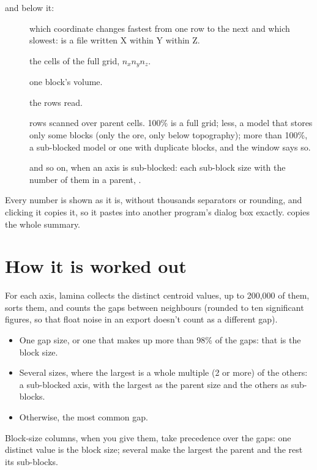 and below it:

\begin{description}
\item[] which coordinate changes fastest from one row to the next and which slowest:
 is a file written X within Y within Z.
\item[] the cells of the full grid, $n_x n_y n_z$.
\item[] one block's volume.
\item[] the rows read.
\item[] rows scanned over parent cells. 100\% is a full grid; less, a model that stores only
some blocks (only the ore, only below topography); more than 100\%, a sub-blocked model or one with
duplicate blocks, and the window says so.
\item[] and so on, when an axis is sub-blocked: each sub-block size with the number of
them in a parent, .
\end{description}

Every number is shown as it is, without thousands separators or rounding, and clicking it copies it, so
it pastes into another program's dialog box exactly.  copies the whole summary.

\section{How it is worked out}\label{sec:gridsum-method}

For each axis, lamina collects the distinct centroid values, up to 200{,}000 of them, sorts them, and
counts the gaps between neighbours (rounded to ten significant figures, so that float noise in an
export doesn't count as a different gap).

\begin{itemize}
\item One gap size, or one that makes up more than 98\% of the gaps: that is the block size.
\item Several sizes, where the largest is a whole multiple (2 or more) of the others: a sub-blocked axis,
with the largest as the parent size and the others as sub-blocks.
\item Otherwise, the most common gap.
\end{itemize}

Block-size columns, when you give them, take precedence over the gaps: one distinct value is the block
size; several make the largest the parent and the rest its sub-blocks.

